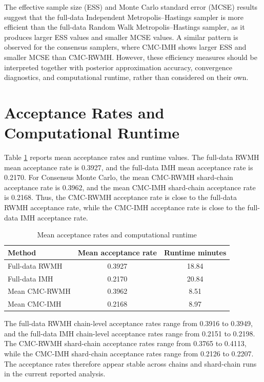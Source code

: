 The effective sample size (ESS) and Monte Carlo standard error (MCSE) results suggest that the full-data Independent Metropolis--Hastings sampler is more efficient than the full-data Random Walk Metropolis--Hastings sampler, as it produces larger ESS values and smaller MCSE values. A similar pattern is observed for the consensus samplers, where CMC-IMH shows larger ESS and smaller MCSE than CMC-RWMH. However, these efficiency measures should be interpreted together with posterior approximation accuracy, convergence diagnostics, and computational runtime, rather than considered on their own.

\section{Acceptance Rates and Computational Runtime}

Table \ref{tab:acceptance_runtime} reports mean acceptance rates and runtime values. The full-data RWMH mean acceptance rate is 0.3927, and the full-data IMH mean acceptance rate is 0.2170. For Consensus Monte Carlo, the mean CMC-RWMH shard-chain acceptance rate is 0.3962, and the mean CMC-IMH shard-chain acceptance rate is 0.2168. Thus, the CMC-RWMH acceptance rate is close to the full-data RWMH acceptance rate, while the CMC-IMH acceptance rate is close to the full-data IMH acceptance rate.

\begin{table}[htbp]
\centering
\caption{Mean acceptance rates and computational runtime}
\label{tab:acceptance_runtime}
\begin{tabular}{lcc}
\hline
Method & Mean acceptance rate & Runtime minutes \\
\hline
Full-data RWMH & 0.3927 & 18.84 \\
Full-data IMH & 0.2170 & 20.84 \\
Mean CMC-RWMH & 0.3962 & 8.51 \\
Mean CMC-IMH & 0.2168 & 8.97 \\
\hline
\end{tabular}
\end{table}

The full-data RWMH chain-level acceptance rates range from 0.3916 to 0.3949, and the full-data IMH chain-level acceptance rates range from 0.2151 to 0.2198. The CMC-RWMH shard-chain acceptance rates range from 0.3765 to 0.4113, while the CMC-IMH shard-chain acceptance rates range from 0.2126 to 0.2207. The acceptance rates therefore appear stable across chains and shard-chain runs in the current reported analysis.




